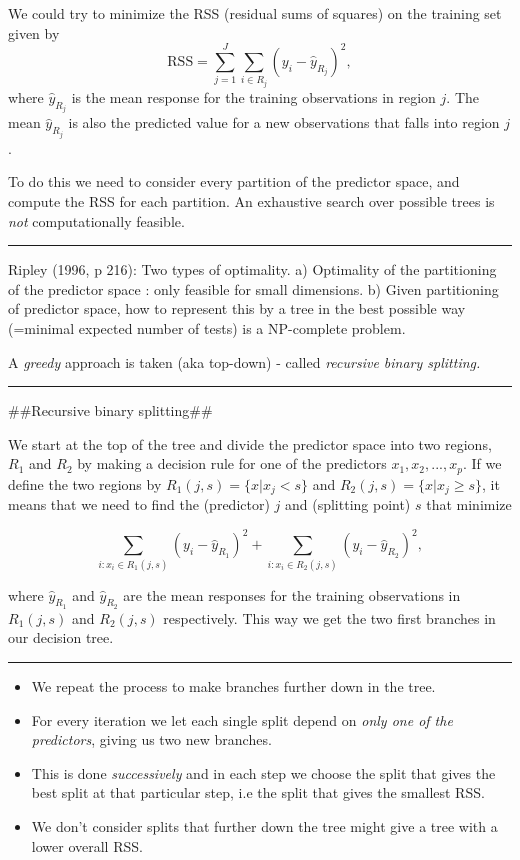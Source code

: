 \documentclass[]{article}
\providecommand{\tightlist}{%
  \setlength{\itemsep}{0pt}\setlength{\parskip}{0pt}}
\begin{document}
We could try to minimize the RSS (residual sums of squares) on the
training set given by \[
\text{RSS}=\sum_{j=1}^J \sum_{i \in R_j}(y_i-\hat{y}_{R_j})^2,
\] where \(\hat{y}_{R_j}\) is the mean response for the training
observations in region \(j\). The mean \(\hat{y}_{R_j}\) is also the
predicted value for a new observations that falls into region \(j\).

To do this we need to consider every partition of the predictor space,
and compute the RSS for each partition. An exhaustive search over
possible trees is \emph{not} computationally feasible.

\begin{center}\rule{0.5\linewidth}{\linethickness}\end{center}

Ripley (1996, p 216): Two types of optimality. a) Optimality of the
partitioning of the predictor space : only feasible for small
dimensions. b) Given partitioning of predictor space, how to represent
this by a tree in the best possible way (=minimal expected number of
tests) is a NP-complete problem.

A \emph{greedy} approach is taken (aka top-down) - called
\emph{recursive binary splitting.}

\begin{center}\rule{0.5\linewidth}{\linethickness}\end{center}

\#\#Recursive binary splitting\#\#

We start at the top of the tree and divide the predictor space into two
regions, \(R_1\) and \(R_2\) by making a decision rule for one of the
predictors \(x_1, x_2,...,x_p\). If we define the two regions by
\(R_1(j,s)=\{x|x_j<s\}\) and \(R_2(j,s)=\{x|x_j\geq s\}\), it means that
we need to find the (predictor) \(j\) and (splitting point) \(s\) that
minimize

\[\sum_{i: x_i \in R_1(j,s)}(y_i-\hat{y}_{R_1})^2+\sum_{i: x_i \in R_2(j,s)}(y_i -\hat{y}_{R_2})^2,\]

where \(\hat{y}_{R_1}\) and \(\hat{y}_{R_2}\) are the mean responses for
the training observations in \(R_1(j,s)\) and \(R_2(j,s)\) respectively.
This way we get the two first branches in our decision tree.

\begin{center}\rule{0.5\linewidth}{\linethickness}\end{center}

\begin{itemize}
\tightlist
\item
  We repeat the process to make branches further down in the tree.
\item
  For every iteration we let each single split depend on \emph{only one
  of the predictors}, giving us two new branches.
\item
  This is done \emph{successively} and in each step we choose the split
  that gives the best split at that particular step, i.e the split that
  gives the smallest RSS.
\item
  We don't consider splits that further down the tree might give a tree
  with a lower overall RSS.
\end{itemize}
\end{document}
